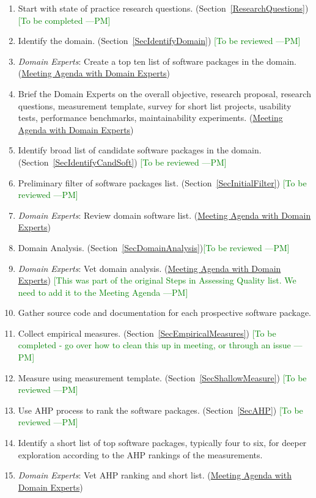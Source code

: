 \documentclass[letterpaper,cleveref]{lipics-v2019}
\newcommand{\authornote}[3]{\textcolor{#1}{[#3 ---#2]}}
\newcommand{\authornote}[3]{}
\newcommand{\pmi}[1]{\authornote{green}{PM}{#1}} %
\theoremstyle{definition}
\begin{document}
\begin{enumerate}
\item Start with state of practice research questions. (Section~\ref{ResearchQuestions}) \pmi{To be completed}
\item Identify the domain. (Section~\ref{SecIdentifyDomain}) \pmi{To be reviewed}
\item \emph{Domain Experts}: Create a top ten list of software packages in the domain. (\href{run:Meeting Agenda with Domain Experts.pdf}{Meeting Agenda with Domain Experts})
\item Brief the Domain Experts on the overall objective, research proposal, research questions, measurement template, survey for short list projects, usability tests, performance benchmarks, maintainability experiments. (\href{run:Meeting Agenda with Domain Experts.pdf}{Meeting Agenda with Domain Experts})
\item Identify broad list of candidate software packages in the domain. (Section~\ref{SecIdentifyCandSoft}) \pmi{To be reviewed}
\item Preliminary filter of software packages list. (Section~\ref{SecInitialFilter}) \pmi{To be reviewed}
\item \emph{Domain Experts}: Review domain software list. (\href{run:Meeting Agenda with Domain Experts.pdf}{Meeting Agenda with Domain Experts})
\item Domain Analysis. (Section~\ref{SecDomainAnalysis})\pmi{To be reviewed}
\item \emph{Domain Experts}: Vet domain analysis. (\href{run:Meeting Agenda with Domain Experts.pdf}{Meeting Agenda with Domain Experts}) \pmi{This was part of the original Steps in Assessing Quality list. We need to add it to the Meeting Agenda}
\item Gather source code and documentation for each prospective software package.
\item Collect empirical measures. (Section~\ref{SecEmpiricalMeasures}) \pmi{To be completed - go over how to clean this up in meeting, or through an issue}
\item Measure using measurement template. (Section~\ref{SecShallowMeasure}) \pmi{To be reviewed}
\item Use AHP process to rank the software packages. (Section~\ref{SecAHP}) \pmi{To be reviewed}
\item Identify a short list of top software packages, typically four to six, for deeper exploration according to the AHP rankings of the measurements.
\item \emph{Domain Experts}: Vet AHP ranking and short list. (\href{run:Meeting Agenda with Domain Experts.pdf}{Meeting Agenda with Domain Experts})

\end{enumerate}
\end{document}
